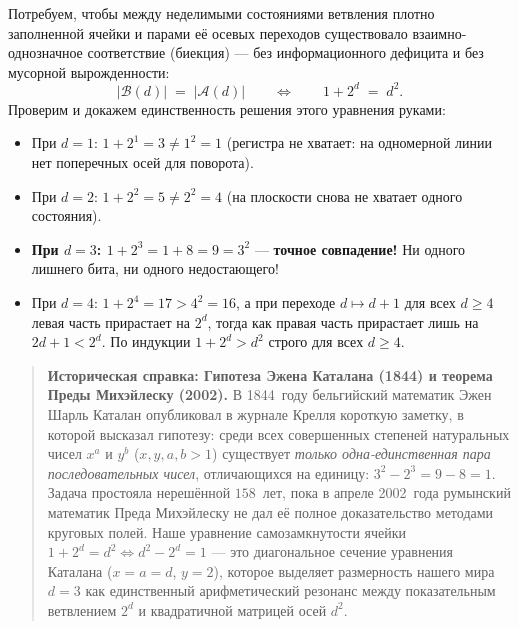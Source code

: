 Потребуем, чтобы между неделимыми состояниями ветвления плотно заполненной ячейки и парами её осевых переходов существовало взаимно-однозначное соответствие (биекция) --- без информационного дефицита и без мусорной вырожденности:
\begin{equation}
  \label{eq:course-catalan}
  |\mathcal{B}(d)| \;=\; |\mathcal{A}(d)|
  \qquad\Longleftrightarrow\qquad
  1 + 2^d \;=\; d^2.
\end{equation}
Проверим и докажем единственность решения этого уравнения руками:
\begin{itemize}[noitemsep]
\item При $d = 1$: $1 + 2^1 = 3 \ne 1^2 = 1$ (регистра не хватает: на одномерной линии нет поперечных осей для поворота).
\item При $d = 2$: $1 + 2^2 = 5 \ne 2^2 = 4$ (на плоскости снова не хватает одного состояния).
\item \textbf{При $d = 3$: $1 + 2^3 = 1 + 8 = 9 = 3^2$} --- \textbf{точное совпадение!} Ни одного лишнего бита, ни одного недостающего!
\item При $d = 4$: $1 + 2^4 = 17 > 4^2 = 16$, а при переходе $d \mapsto d + 1$ для всех $d \ge 4$ левая часть прирастает на $2^d$, тогда как правая часть прирастает лишь на $2d + 1 < 2^d$. По индукции $1 + 2^d > d^2$ строго для всех $d \ge 4$.
\end{itemize}

\begin{quote}
\small\textbf{Историческая справка: Гипотеза Эжена Каталана (1844) и теорема Преды Михэйлеску (2002).}
В 1844~году бельгийский математик Эжен Шарль Каталан опубликовал в журнале Крелля короткую заметку, в которой высказал гипотезу: среди всех совершенных степеней натуральных чисел $x^a$ и $y^b$ ($x,y,a,b > 1$) существует \emph{только одна-единственная пара последовательных чисел}, отличающихся на единицу: $3^2 - 2^3 = 9 - 8 = 1$. Задача простояла нерешённой $158$~лет, пока в апреле 2002~года румынский математик Преда Михэйлеску не дал её полное доказательство методами круговых полей. Наше уравнение самозамкнутости ячейки $1 + 2^d = d^2 \iff d^2 - 2^d = 1$ --- это диагональное сечение уравнения Каталана ($x = a = d$, $y = 2$), которое выделяет размерность нашего мира $d = 3$ как единственный арифметический резонанс между показательным ветвлением $2^d$ и квадратичной матрицей осей $d^2$.
\end{quote}

